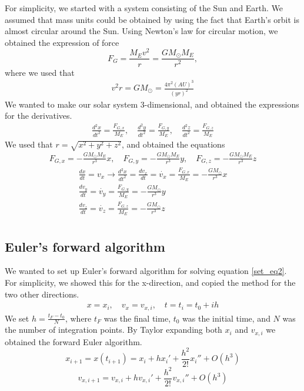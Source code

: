 \documentclass[12pt]{article}
\begin{document}
\noindent For simplicity, we started with a system consisting of the Sun and Earth. We assumed that mass units could be obtained by using the fact that Earth's orbit is almost circular around the Sun. Using Newton's law for circular motion, we obtained the expression of force
\begin{equation}
F_G = \frac{M_E v^2}{r} = \frac{GM_{\odot}M_E}{r^2},
\end{equation}
\noindent where we used that
\begin{align*}
v^2r = GM_{\odot} = \frac{4 \pi^2 (AU)^3}{(yr)^2}
\end{align*}
\noindent We wanted to make our solar system 3-dimensional, and obtained the expressions for the derivatives.
\begin{align*}
\frac{d^2x}{dt^2} = \frac{F_{G,x}}{M_E}, \quad \frac{d^2y}{dt^2} = \frac{F_{G,y}}{M_E}, \quad \frac{d^2z}{dt^2} = \frac{F_{G,z}}{M_E}
\end{align*}
\noindent We used that $r = \sqrt{x^2 + y^2 + z^2}$, and obtained the equations
\begin{align*}
F_{G,x} = -\frac{GM_{\odot}M_E}{r^3}x, \quad F_{G,y} = -\frac{GM_{\odot}M_E}{r^3}y, \quad F_{G,z} = -\frac{GM_{\odot}M_E}{r^3}z
\end{align*}
\begin{equation} \label{set_eq2}
\begin{split}
\frac{dx}{dt} = v_x \rightarrow \frac{d^2x}{dt^2} = \frac{dv_x}{dt} = \dot{v_x} = \frac{F_{G,x}}{M_E} = -\frac{GM_{\odot}}{r^3}x\\
\frac{dv_y}{dt} = \dot{v_y} = \frac{F_{G,y}}{M_E} = -\frac{GM_{\odot}}{r^3}y\\
\frac{dv_z}{dt} = \dot{v_z} = \frac{F_{G,z}}{M_E} = -\frac{GM_{\odot}}{r^3}z\\
\end{split}
\end{equation}

\subsection{Euler's forward algorithm}

\noindent We wanted to set up Euler's forward algorithm for solving equation \ref{set_eq2}. For simplicity, we showed this for the x-direction, and copied the method for the two other directions.
\begin{align*}
x = x_i, \quad v_x = v_{x,i}, \quad t = t_i = t_0 + ih
\end{align*}
\noindent We set $h = \frac{t_F - t_0}{N}$, where $t_F$ was the final time, $t_0$ was the initial time, and $N$ was the number of integration points. By Taylor expanding both $x_i$ and $v_{x,i}$ we obtained the forward Euler algorithm.
\begin{equation} \label{taylor_pos}
x_{i+1} = x(t_{i+1}) = x_i + hx_i' + \frac{h^2}{2!}x_i'' + O(h^3)
\end{equation}
\begin{equation} \label{taylor_vel}
v_{x, i+1} = v_{x,i} + hv_{x,i}' + \frac{h^2}{2!}v_{x,i}'' + O(h^3)
\end{equation}
\end{document}
